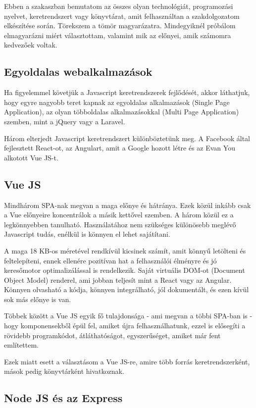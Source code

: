 Ebben a szakaszban bemutatom az összes olyan technológiát, programozási nyelvet, keretrendszert vagy könyvtárat, amit felhasználtan a szakdolgozatom elkészítése során. Törekszem a tömör magyarázatra. Mindegyiknél próbálom elmagyarázni miért választottam, valamint mik az előnyei, amik számomra kedvezőek voltak.

\subsection{Egyoldalas webalkalmazások}

Ha figyelemmel követjük a Javascript keretrendszerek fejlődését, akkor láthatjuk, hogy egyre nagyobb teret kapnak az egyoldalas alkalmazások (Single Page Application), az olyan többoldalas alkalmazásokkal (Multi Page Application) szemben, mint a jQuery vagy a Laravel.

Három elterjedt Javascript keretrendszert különböztetünk meg. A Facebook által fejlesztett React-ot, az Angulart, amit a Google hozott létre és az Evan You alkotott Vue JS-t.

\subsection{Vue JS}

Mindhárom SPA-nak megvan a maga előnye és hátránya. Ezek közül inkább csak a Vue előnyeire koncentrálok a másik kettővel szemben. A három közül ez a legkönnyebben tanulható. Használatához nem szükséges különösebb meglévő Javascript tudás, enélkül is könnyen el lehet sajátítani.

A maga 18 KB-os méretével rendkívül kicsinek számít, amit könnyű letölteni és feltelepíteni, ennek ellenére pozitívan hat a felhasználói élményre és jó keresőmotor optimalizálással is rendelkezik. Saját virtuális DOM-ot (Document Object Model) renderel, ami jobban teljesít mint a React vagy az Angular. Könnyen olvasható a kódja, könnyen integrálható, jól dokumentált, és ezen kívül sok más előnye is van.

Többek között a Vue JS egyik fő tulajdonsága - ami megvan a többi SPA-ban is - hogy komponensekből épül fel, amiket újra felhasználhatunk, ezzel is elősegíti a rövidebb programkódot, átláthatóságot, egyszerűséget, amiket már fent említettem.

Ezek miatt esett a választásom a Vue JS-re, amire több forrás keretrendszerként, mások pedig könyvtárként hivatkoznak.

\subsection{Node JS és az Express}

